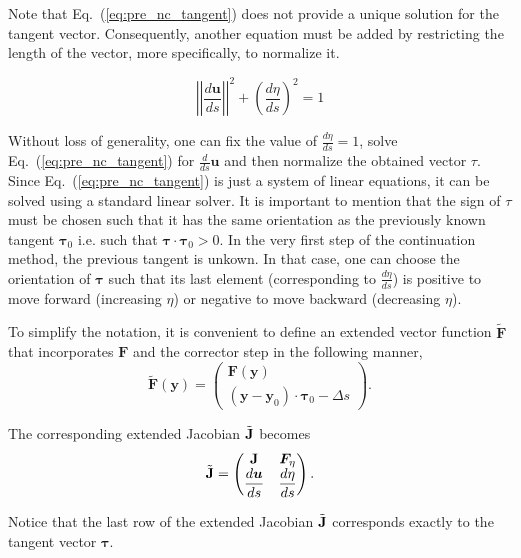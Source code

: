 Note that Eq.~(\ref{eq:pre_nc_tangent}) does not provide a unique solution for
the tangent vector. Consequently, another equation must be added by restricting
the length of the vector, more specifically, to normalize it.

\begin{equation}
    \left|\left|\dfrac{d\bm{u}}{ds}\right|\right|^2 + \left(\dfrac{d\eta}{ds}\right)^2 = 1
    \label{eq:pre_nc_tangent_normalization}
\end{equation}

Without loss of generality, one can fix the value of $\frac{d \eta}{ds} = 1$, solve 
Eq.~(\ref{eq:pre_nc_tangent}) for $\frac{d}{ds}\bm{u}$ and then normalize the obtained
vector $\tau$. Since Eq.~(\ref{eq:pre_nc_tangent}) is just a system of linear equations, 
it can be solved using a standard linear solver. It is important to mention that the
sign of $\tau$ must be chosen such that it has the same orientation as the 
previously known tangent $\bm{\tau}_0$ i.e. such that $\bm{\tau} \cdot \bm{\tau}_0 > 0$. 
In the very first step of the continuation method, the previous tangent is unkown. 
In that case, one can choose the orientation of $\bm{\tau}$ such that its last element 
(corresponding to  $\frac{d \eta}{ds}$) is positive to move forward (increasing $\eta$) or
negative to move backward (decreasing $\eta$).


To simplify the notation, it is convenient to define an extended vector 
function $\tilde{ \bm{F} }$ that incorporates $\bm{F}$ and the corrector 
step in the following manner,
\begin{equation}
    \tilde{\bm{F}}(\bm{y}) = 
    \begin{pmatrix}
        \bm{F}(\bm{y}) \\ 
        (\bm{y} - \bm{y}_0) \cdot \bm{\tau}_0 - \Delta s
    \end{pmatrix}.
    \label{eq:pre_nc_palc_system}
\end{equation} 

The corresponding extended Jacobian $\tilde{\mathbf{J}}$ becomes
\begin{equation}
    \tilde{\mathbf{J}} = 
    \begin{pmatrix}
        \mathbf{J} & \bm{F}_\eta \\
        \dfrac{d\bm{u}}{ds} & \dfrac{d\eta}{ds} \\
    \end{pmatrix}.
\end{equation}

Notice that the last row of the extended Jacobian $\tilde{\mathbf{J}}$ corresponds
exactly to the tangent vector $\bm{\tau}$. 

